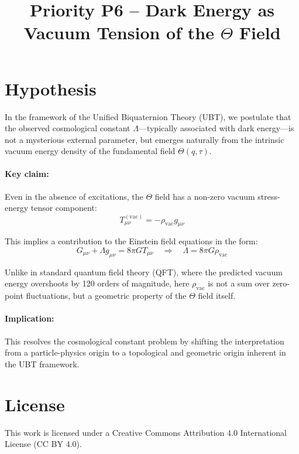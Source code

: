 \documentclass[12pt]{article}
\title{Priority P6 – Dark Energy as Vacuum Tension of the $\Theta$ Field}
\author{}
\date{}
\begin{document}
\maketitle

\section*{Hypothesis}

In the framework of the Unified Biquaternion Theory (UBT), we postulate that the observed cosmological constant $\Lambda$---typically associated with dark energy---is not a mysterious external parameter, but emerges naturally from the intrinsic vacuum energy density of the fundamental field $\Theta(q, \tau)$.

\paragraph{Key claim:} Even in the absence of excitations, the $\Theta$ field has a non-zero vacuum stress-energy tensor component:
\[
T_{\mu\nu}^{(\text{vac})} = -\rho_{\text{vac}} g_{\mu\nu}
\]

This implies a contribution to the Einstein field equations in the form:
\[
G_{\mu\nu} + \Lambda g_{\mu\nu} = 8\pi G T_{\mu\nu} \quad \Rightarrow \quad \Lambda = 8\pi G \rho_{\text{vac}}
\]

Unlike in standard quantum field theory (QFT), where the predicted vacuum energy overshoots by 120 orders of magnitude, here $\rho_{\text{vac}}$ is not a sum over zero-point fluctuations, but a geometric property of the $\Theta$ field itself.

\paragraph{Implication:} This resolves the cosmological constant problem by shifting the interpretation from a particle-physics origin to a topological and geometric origin inherent in the UBT framework.


\section*{License}
This work is licensed under a Creative Commons Attribution 4.0 International License (CC BY 4.0).
\end{document}
